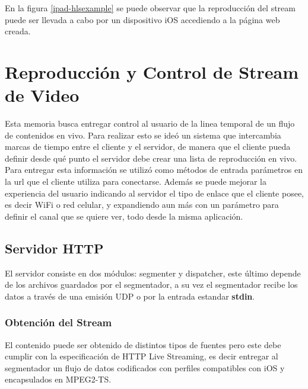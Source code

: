En la figura \ref{ipad-hlsexample} se puede observar que la reproducción del stream puede ser llevada a cabo por un dispositivo iOS accediendo a la página web creada.\\








	
	
\section{Reproducción y Control de Stream de Video}

	Esta memoria busca entregar control al usuario de la linea temporal de un flujo de contenidos en vivo. Para realizar esto se ideó un sistema que intercambia marcas de tiempo entre el cliente y el servidor, de manera que el cliente pueda definir desde qué punto el servidor debe crear una lista de reproducción en vivo. \\
	
	Para entregar esta información se utilizó como métodos de entrada parámetros en la url que el cliente utiliza para conectarse. Además se puede mejorar la experiencia del usuario indicando al servidor el tipo de enlace que el cliente posee, es decir WiFi o red celular, y expandiendo aun más con un parámetro para definir el canal que se quiere ver, todo desde la misma aplicación.
	
	\subsection{Servidor HTTP}
	El servidor consiste en dos módulos: segmenter y dispatcher, este último depende de los archivos guardados por el segmentador, a su vez el segmentador recibe los datos a través de una emisión UDP o por la entrada estandar \textbf{stdin}.
		\subsubsection{Obtención del Stream}
El contenido puede ser obtenido de distintos tipos de fuentes pero este debe cumplir con la especificación de HTTP Live Streaming, es decir entregar al segmentador un flujo de datos codificados con perfiles compatibles con iOS y encapsulados en MPEG2-TS.
